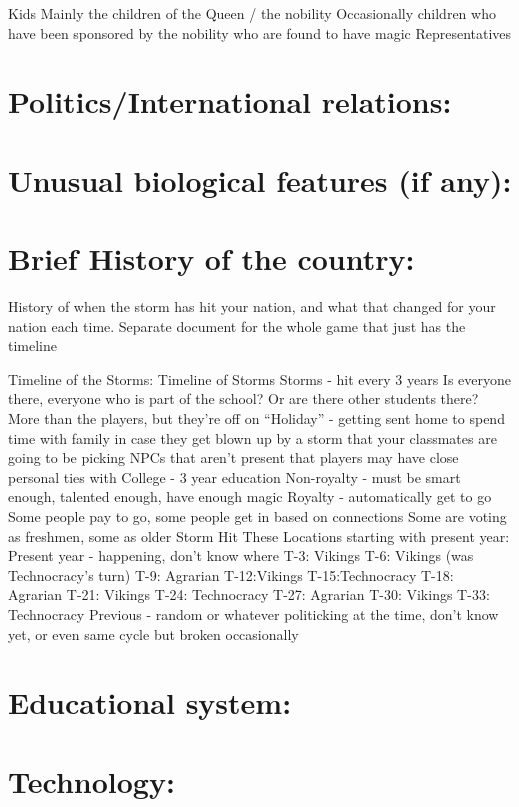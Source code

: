 \documentclass[blue]{GL2020}
\begin{document}
Kids
Mainly the children of the Queen / the nobility
Occasionally children who have been sponsored by the nobility who are found to have magic
Representatives

\section{Politics/International relations:}

\section{Unusual biological features (if any):}

\section{Brief History of the country:}

History of when the storm has hit your nation, and what that changed for your nation each time.
Separate document for the whole game that just has the timeline

Timeline of the Storms:
Timeline of Storms
Storms - hit every 3 years
Is everyone there, everyone who is part of the school?  Or are there other students there?
More than the players, but they’re off on “Holiday” - getting sent home to spend time with family in case they get blown up by a storm that your classmates are going to be picking
NPCs that aren’t present that players may have close personal ties with
College - 3 year education
Non-royalty - must be smart enough, talented enough, have enough magic
Royalty - automatically get to go
Some people pay to go, some people get in based on connections
Some are voting as freshmen, some as older
Storm Hit These Locations starting with present year:
Present year - happening, don’t know where
T-3: Vikings
T-6: Vikings (was Technocracy’s turn)
T-9: Agrarian
T-12:Vikings
T-15:Technocracy
T-18: Agrarian
T-21: Vikings
T-24: Technocracy
T-27: Agrarian
T-30: Vikings
T-33: Technocracy
Previous - random or whatever politicking at the time, don’t know yet, or even same cycle but broken occasionally

\section{Educational system:}

\section{Technology:}
\end{document}
